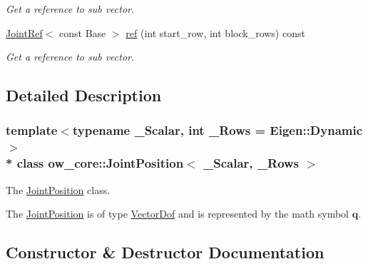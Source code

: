 \begin{DoxyCompactItemize}
\begin{DoxyCompactList}\small\item\em Get a reference to sub vector. \end{DoxyCompactList}\item 
\hyperlink{classow__core_1_1JointRef}{Joint\+Ref}$<$ const Base $>$ \hyperlink{classow__core_1_1JointPosition_a9530b82be5df1232186c9a6d80dac247}{ref} (int start\+\_\+row, int block\+\_\+rows) const \hypertarget{classow__core_1_1JointPosition_a9530b82be5df1232186c9a6d80dac247}{}\label{classow__core_1_1JointPosition_a9530b82be5df1232186c9a6d80dac247}

\begin{DoxyCompactList}\small\item\em Get a reference to sub vector. \end{DoxyCompactList}\end{DoxyCompactItemize}


\subsection{Detailed Description}
\subsubsection*{template$<$typename \+\_\+\+Scalar, int \+\_\+\+Rows = Eigen\+::\+Dynamic$>$\\*
class ow\+\_\+core\+::\+Joint\+Position$<$ \+\_\+\+Scalar, \+\_\+\+Rows $>$}

The \hyperlink{classow__core_1_1JointPosition}{Joint\+Position} class. 

The \hyperlink{classow__core_1_1JointPosition}{Joint\+Position} is of type \hyperlink{classow__core_1_1VectorDof}{Vector\+Dof} and is represented by the math symbol $\mathbf{q}$. 

\subsection{Constructor \& Destructor Documentation}

